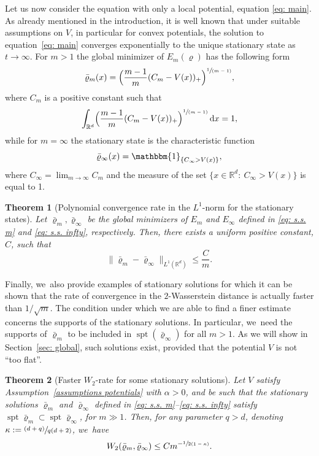 \documentclass[JEP,XML,SOM,Unicode,published]{cedram}
\newcommand{\psfrac}[2]{\sfrac{(#1)}{#2}}
\newcommand{\spfrac}[2]{\sfrac{#1}{(#2)}}
\DeclareMathOperator{\spt}{spt}
\let\mathds\mathbbm
\newcommand{\Bprt}[1]{\Bigl(#1\Bigr)}
\newcommand{\dx}[1]{\mathop{}\!\mathrm{d} #1}
\newcommand{\R}{\mathbb{R}}
\theoremstyle{plain}
\newtheorem{theorem}{Theorem}[section]
\theoremstyle{remark}
\begin{document}
Let us now consider the equation with only a local potential, equation \eqref{eq: main}. As already mentioned in the introduction, it is well known that under suitable assumptions on $V$, in particular for convex potentials, the solution to equation~\eqref{eq: main} converges exponentially to the {unique} stationary state as $t\to\infty$. For $m>1$ the global minimizer of $E_m(\varrho)$ has the following form
\begin{equation}\label{eq: s.s. m}
\bar\varrho_m(x) = \Bprt{\frac{m-1}{m}(C_m - V(x))_+}^{\spfrac{1}{m-1}},
\end{equation}
where $C_m$ is a positive constant such that
\[
\int_{\R^d} \Bprt{\frac{m-1}{m}(C_m - V(x))_+}^{\spfrac{1}{m-1}} \dx x =1,
\]
while for $m=\infty$ the stationary state is the characteristic function
\begin{equation}\label{eq: s.s. infty}
\bar\varrho_\infty(x)=\mathds{1}_{\{C_\infty > V(x)\}},
\end{equation}
where $C_\infty=\lim_{m\to\infty}C_m$ and the measure of the set $\{x\in\R^d: \ C_\infty>V(x)\}$ is equal to 1.

\begin{theorem}[Polynomial {convergence} rate in the $L^1$-norm for the stationary states]\label{thm: L1 s.s.}
Let $\bar\varrho_m, \bar\varrho_\infty$ be the global minimizers of $E_m$ and $E_\infty$ defined in \eqref{eq: s.s. m} and \eqref{eq: s.s. infty}, respectively. Then, there exists a uniform positive constant, $C$, such that
\begin{equation*}
\|\bar\varrho_m- \bar\varrho_\infty\|_{L^1(\R^d)} \leq \frac{C}{{m}}.
\end{equation*}
\end{theorem}

Finally, we~also provide examples of stationary solutions for which it can be shown that the rate of convergence in the $2$-Wasserstein distance is actually faster than $1/\sqrt m$. The condition under which we are able to find a finer estimate concerns the supports of the stationary solutions. In particular, we~need the supports of $\bar\varrho_m$ to be included in $\spt (\bar\varrho_\infty)$ for all $m>1$. As we will show in Section~\ref{sec: global}, such solutions exist, provided that the potential $V$ is not ``too flat''.

\begin{theorem}[Faster $W_2$-rate for some stationary solutions]\label{prop: s.s. improved}
Let $V$ satisfy Assumption~\ref{assumptions potentials} with $\alpha>0$, and be such that the stationary solutions $\bar\varrho_m$ and $\bar\varrho_\infty$ defined in \eqref{eq: s.s. m}--\eqref{eq: s.s. infty} satisfy $\spt{\bar\varrho_m}\subset \spt{\bar\varrho_\infty}$, for $m\gg 1$. Then, for any parameter $q>d$, denoting $\kappa := \psfrac{d+q}{q(d+2)}$, we~have
\begin{equation}\label{eq: improved}
W_2(\bar\varrho_m,\bar\varrho_\infty) \leq {C}{m^{-\sfrac{1}{2(1-\kappa)}}}.
\end{equation}
\end{theorem}
\end{document}
